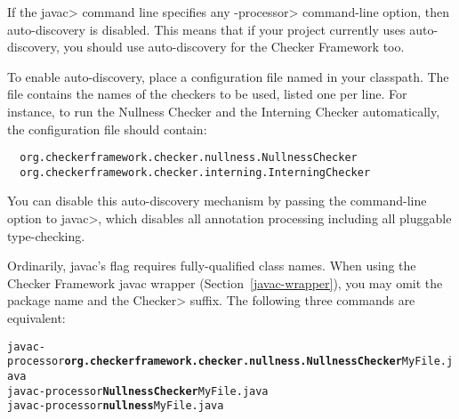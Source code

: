 If the \<javac> command line specifies any \<-processor> command-line
option, then auto-discovery is disabled.  This means that if your project
currently uses auto-discovery, you should use auto-discovery for the
Checker Framework too.

\begin{sloppypar}
To enable auto-discovery, place a configuration file named
in your classpath.  The file contains the names of the checkers to
be used, listed one per line.  For instance, to run the Nullness Checker and the
Interning Checker automatically, the configuration file should contain:
\end{sloppypar}

\begin{smaller}
\begin{Verbatim}
  org.checkerframework.checker.nullness.NullnessChecker
  org.checkerframework.checker.interning.InterningChecker
\end{Verbatim}
\end{smaller}

You can disable this auto-discovery mechanism by passing the
 command-line option to \<javac>, which disables all
annotation processing including all pluggable type-checking.





Ordinarily, javac's  flag requires fully-qualified class names.
When using the Checker Framework javac wrapper (Section~\ref{javac-wrapper}), you may
omit the package name and the \<Checker> suffix.
The following three commands are equivalent:

\begin{alltt}
  javac -processor \textbf{org.checkerframework.checker.nullness.NullnessChecker} MyFile.java
  javac -processor \textbf{NullnessChecker} MyFile.java
  javac -processor \textbf{nullness} MyFile.java
\end{alltt}

